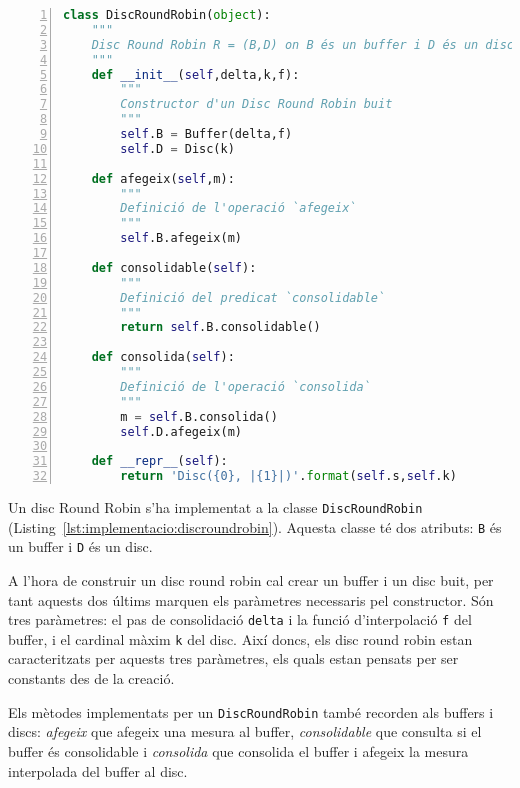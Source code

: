 \begin{lstlisting}[float,language=Python,caption=Implementació de la classe DiscRoundRobin,label=lst:implementacio:discroundrobin,numbers=left]
class DiscRoundRobin(object):
    """
    Disc Round Robin R = (B,D) on B és un buffer i D és un disc
    """
    def __init__(self,delta,k,f):
        """
        Constructor d'un Disc Round Robin buit
        """
        self.B = Buffer(delta,f)
        self.D = Disc(k)

    def afegeix(self,m):
        """
        Definició de l'operació `afegeix`
        """
        self.B.afegeix(m)

    def consolidable(self):
        """
        Definició del predicat `consolidable`
        """
        return self.B.consolidable()

    def consolida(self):
        """
        Definició de l'operació `consolida`
        """
        m = self.B.consolida()
        self.D.afegeix(m)

    def __repr__(self):
        return 'Disc({0}, |{1}|)'.format(self.s,self.k)
\end{lstlisting}


Un disc Round Robin s'ha implementat a la classe \verb+DiscRoundRobin+ (Listing~\ref{lst:implementacio:discroundrobin}). Aquesta classe té dos atributs: \verb+B+ és un buffer i \verb+D+ és un disc.

A l'hora de construir un disc round robin cal crear un buffer i un disc buit, per tant aquests dos últims marquen els paràmetres necessaris pel constructor. Són tres paràmetres: el pas de consolidació \verb+delta+ i la funció d'interpolació \verb+f+ del buffer, i el cardinal màxim \verb+k+ del disc. Així doncs, els disc round robin estan caracteritzats per aquests tres paràmetres, els quals estan pensats per ser constants des de la creació.

Els mètodes implementats per un \verb+DiscRoundRobin+ també recorden als buffers i discs: \emph{afegeix} que afegeix una mesura al buffer, \emph{consolidable} que consulta si el buffer és consolidable i \emph{consolida} que consolida el buffer i afegeix la mesura interpolada del buffer al disc.




